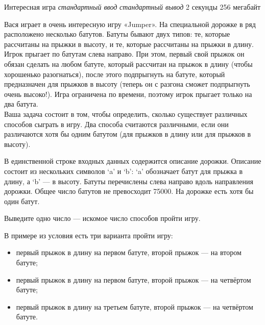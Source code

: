 \begin{problem}%
{Интересная игра}%
{\textsl{стандартный ввод}}%
{\textsl{стандартный вывод}}%
{2 секунды}%
{256 мегабайт}{}

Вася играет в очень интересную игру «Jumper». На специальной дорожке в ряд расположено несколько батутов. Батуты бывают двух типов: те, которые рассчитаны на прыжки в высоту, и те, которые рассчитаны на прыжки в длину. Игрок прыгает по батутам слева направо. При этом, первый свой прыжок он обязан сделать на любом батуте, который рассчитан на прыжок в длину (чтобы хорошенько разогнаться), после этого подпрыгнуть на батуте, который предназначен для прыжков в высоту (теперь он с разгона сможет подпрыгнуть очень высоко!). Игра ограничена по времени, поэтому игрок прыгает только на два батута.\\

Ваша задача состоит в том, чтобы определить, сколько существует различных способов сыграть в игру. Два способа считаются различными, если они различаются хотя бы одним батутом (для прыжков в длину или для прыжков в высоту).

\InputFile

В единственной строке входных данных содержится описание дорожки. Описание состоит из нескольких символов ‘a’ и ‘b’: ‘a’ обозначает батут для прыжка в длину, а ‘b’ — в высоту. Батуты перечислены слева направо вдоль направления дорожки. Общее число батутов не превосходит 75000. На дорожке есть хотя бы один батут.

\OutputFile

Выведите одно число — искомое число способов пройти игру.

\Examples

\begin{example}
%
\end{example}

\Explanation

В примере из условия есть три варианта пройти игру:
\begin{itemize}
\item первый прыжок в длину на первом батуте, второй прыжок — на втором батуте;
\item первый прыжок в длину на первом батуте, второй прыжок — на четвёртом батуте;
\item первый прыжок в длину на третьем батуте, второй прыжок — на четвёртом батуте.
\end{itemize}

\end{problem}